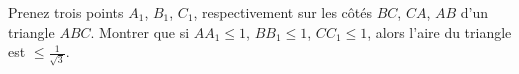 Prenez trois points $A_1$, $B_1$, $C_1$, respectivement sur les côtés $BC$,
$CA$, $AB$ d'un triangle $ABC$. Montrer que si $AA_1 \leq 1$, $BB_1 \leq 1$,
$CC_1 \leq 1$, alors l'aire du triangle est $\leq \frac{1}{\sqrt{3}}$.
